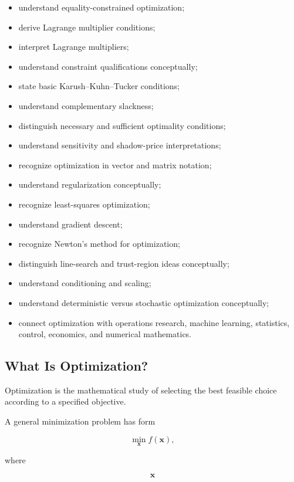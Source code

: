 {\begin{itemize}
    \item understand equality-constrained optimization;
    \item derive Lagrange multiplier conditions;
    \item interpret Lagrange multipliers;
    \item understand constraint qualifications conceptually;
    \item state basic Karush--Kuhn--Tucker conditions;
    \item understand complementary slackness;
    \item distinguish necessary and sufficient optimality conditions;
    \item understand sensitivity and shadow-price interpretations;
    \item recognize optimization in vector and matrix notation;
    \item understand regularization conceptually;
    \item recognize least-squares optimization;
    \item understand gradient descent;
    \item recognize Newton's method for optimization;
    \item distinguish line-search and trust-region ideas conceptually;
    \item understand conditioning and scaling;
    \item understand deterministic versus stochastic optimization
          conceptually;
    \item connect optimization with operations research, machine learning,
          statistics, control, economics, and numerical mathematics.
\end{itemize}
}

\subsection{What Is Optimization?}
\label{subsec:what-is-optimization}

Optimization is the mathematical study of selecting the best feasible
choice according to a specified objective.

A general minimization problem has form

\[
\boxed{
\min_{\mathbf{x}}
f(\mathbf{x}),
}
\]

where

\[
\mathbf{x}
\]

